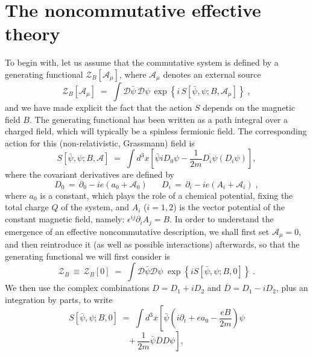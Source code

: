 \documentclass[a4paper,12pt]{article}
\begin{document}
\section{The noncommutative effective theory}\label{sec:eff}
To begin with, let us assume that the commutative system is defined by
a generating functional ${\mathcal Z}_B[{\mathcal A}_\mu]$, where
${\mathcal A}_\mu$ denotes an external source
\begin{equation}
  \label{eq:zcomm}
  {\mathcal Z}_B[{\mathcal A}_\mu]\;=\; \int { \mathcal D}{\bar\psi}\,
{\mathcal D}\psi \, \exp \left\{i\, S[{\bar\psi},\psi;B,{\mathcal A}_\mu] \right\}     \;,
\end{equation}
and we have made explicit the fact that the action $S$ depends on
the magnetic field $B$. The generating functional has been written 
as a path integral over a charged field, which will typically be a 
spinless fermionic field. The corresponding action for this 
(non-relativistic, Grassmann) field is 
\begin{equation}
S[{\bar \psi},\psi;B, {\mathcal A}] \;=\; \int d^3x \left[ {\bar\psi} 
i  D_0 \psi - \frac{1}{2m} \overline{D_i \psi} (D_i \psi) \right],
\end{equation}
where the covariant derivatives are defined by
\begin{equation}
  \label{eq:defcov}
D_0 \,=\, \partial_0 - ie(a_0 + {\mathcal A}_0)
\;\;\;\;\;\;
D_i \,=\, \partial_i - ie(A_i + {\mathcal A}_i)\;,
\end{equation}
where $a_0$ is a constant, which plays the role of a chemical
potential, fixing the total charge $Q$ of the system, and $A_i$
($i=1,2$) is the vector potential of the constant magnetic field,
namely: $\epsilon^{ij} \partial_i A_j = B$. In order to understand the emergence of
an effective noncommutative description, we shall first set ${\mathcal
  A}_\mu = 0$, and then reintroduce it (as well as possible
interactions) afterwards, so that the generating functional we will
first consider is
\begin{equation} 
{\mathcal Z}_B\,\equiv\,{\mathcal Z}_B[0]\;=\; \int{\mathcal D}{\bar\psi}{\mathcal D}\psi \;
\exp \left \{ i S[{\bar \psi},\psi;B,0] \right\}\;.
\end{equation}
We then use the complex combinations $D = D_1 + i D_2$ and 
${\overline D} = D_1 - i D_2$, plus an integration by parts, to write
$$
S[{\bar \psi},\psi;B,0]\;=\;\int d^3x \left[ {\bar\psi} \left(i \partial_t + e a_0 - 
\frac{ e B}{2 m }\right)\psi \right.
$$
\begin{equation}
\left. + \,\frac{1}{2m} {\bar\psi} {\overline D} D \psi \right],
\end{equation}
\end{document}
